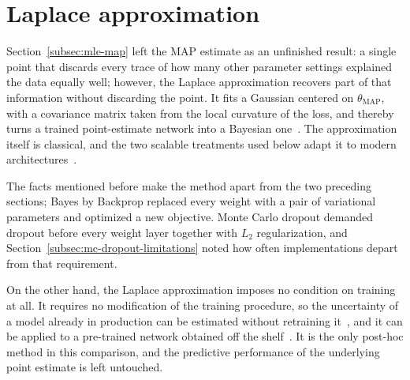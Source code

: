 \section{Laplace approximation}
\label{sec:laplace-approximation}

Section~\ref{subsec:mle-map} left the MAP estimate as an unfinished result: a
single point that discards every trace of how many other parameter settings
explained the data equally well; however, the Laplace approximation recovers part of that
information without discarding the point. It fits a Gaussian centered on
$\theta_{\mathrm{MAP}}$, with a covariance matrix taken from the local curvature
of the loss, and thereby turns a trained point-estimate network into a Bayesian
one~\cite{daxberger2021}. The approximation itself is classical, and the two
scalable treatments used below adapt it to modern architectures~\cite{ritter2018, daxberger2021}.

The facts mentioned before make the method apart from the two preceding sections; Bayes by Backprop
replaced every weight with a pair of variational parameters and optimized a new
objective. Monte Carlo dropout demanded dropout before every weight layer together with $L_2$ regularization, and Section~\ref{subsec:mc-dropout-limitations} noted how often implementations depart from that requirement. 

On the other hand, the Laplace approximation imposes no condition on training at all. It requires no modification of the training procedure, so the uncertainty of a model already in
production can be estimated without retraining it~\cite{ritter2018}, and it can be applied to a pre-trained network obtained off the shelf~\cite{daxberger2021}. It is the only post-hoc method in this comparison, and the predictive performance of the underlying point estimate is left untouched.

